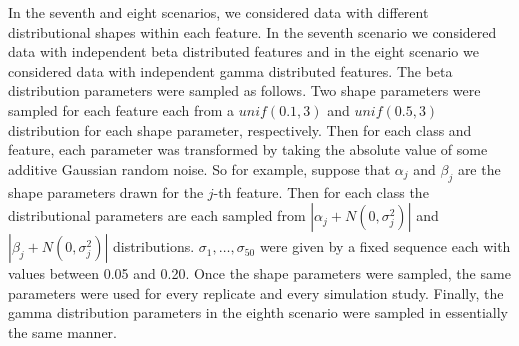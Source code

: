 \documentclass{article}
\begin{document}
In the seventh and eight scenarios, we considered data with different
distributional shapes within each feature.  In the seventh scenario we
considered data with independent beta distributed features and in the eight
scenario we considered data with independent gamma distributed features.  The
beta distribution parameters were sampled as follows.  Two shape parameters were
sampled for each feature each from a $\mathit{unif}(0.1, 3)$ and
$\mathit{unif}(0.5, 3)$ distribution for each shape parameter, respectively.
Then for each class and feature, each parameter was transformed by taking the
absolute value of some additive Gaussian random noise.  So for example, suppose
that $\alpha_j$ and $\beta_j$ are the shape parameters drawn for the $j$-th
feature.  Then for each class the distributional parameters are each sampled
from $|\alpha_j + N(0, \sigma_j^2)|$ and $|\beta_j + N(0, \sigma_j^2)|$
distributions.  $\sigma_1, \dots, \sigma_{50}$ were given by a fixed sequence
each with values between 0.05 and 0.20.  Once the shape parameters were sampled,
the same parameters were used for every replicate and every simulation study.
Finally, the gamma distribution parameters in the eighth scenario were sampled in
essentially the same manner.



\end{document}
